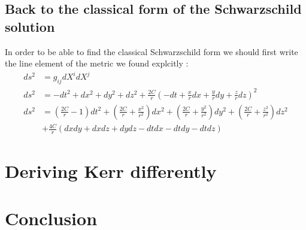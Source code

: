 \documentclass[a4paper,12pt]{article}
\begin{document}
\subsection{Back to the classical form of the Schwarzschild solution}
In order to be able to find the classical Schwarzschild form we should first write the line element of the metric we found explcitly :
\begin{align*}
	ds^2&=g_{ij}dX^idX^j\\
	ds^2&=-dt^2+dx^2+dy^2+dz^2+\frac{2C}{r}(-dt+\frac{x}{r}dx+\frac{y}{r}dy+\frac{z}{r}dz)^2\\
	ds^2&=(\frac{2C}{r}-1)dt^2+(\frac{2C}{r}+\frac{x^2}{r^2})dx^2+(\frac{2C}{r}+\frac{y^2}{r^2})dy^2+(\frac{2C}{r}+\frac{z^2}{r^2})dz^2\\
	&+\frac{4C}{r}(dxdy+dxdz+dydz-dtdx-dtdy-dtdz)
\end{align*}

\section{Deriving Kerr differently}

\section{Conclusion}
\end{document}

